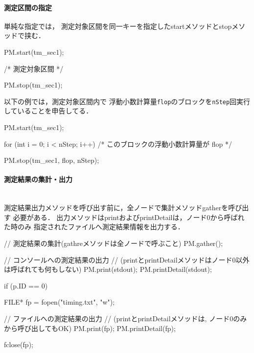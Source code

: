 \paragraph{測定区間の指定}\mbox{}
単純な指定では，
測定対象区間を同一キーを指定したstartメソッドとstopメソッドで挟む．
{\small
\begin{program}
  PM.start(tm_sec1);

  /* 測定対象区間 */

  PM.stop(tm_sec1);
\end{program}
}

以下の例では，測定対象区間内で
浮動小数計算量{\tt flop}のブロックを{\tt nStep}回実行していることを申告してる．
{\small
\begin{program}
  PM.start(tm_sec1);

  for (int i = 0; i < nStep; i++) {
    /* このブロックの浮動小数計算量が flop */
  }

  PM.stop(tm_sec1, flop, nStep);
\end{program}
}

\paragraph{測定結果の集計・出力}\mbox{}\\
測定結果出力メソッドを呼び出す前に，全ノードで集計メソッドgatherを呼び出す
必要がある．
出力メソッドはprintおよびprintDetailは，ノード0から呼ばれた時のみ
指定されたファイルへ測定結果情報を出力する．
{\small
\begin{program}
  // 測定結果の集計(gathreメソッドは全ノードで呼ぶこと)
  PM.gather();

  // コンソールへの測定結果の出力
  // (printとprintDetailメソッドはノード0以外は呼ばれても何もしない)
  PM.print(stdout);
  PM.printDetail(stdout);

  if (p.ID == 0) {
    FILE* fp = fopen("timing.txt", "w");

    // ファイルへの測定結果の出力
    // (printとprintDetailメソッドは, ノード0のみから呼び出してもOK)
    PM.print(fp);
    PM.printDetail(fp);

    fclose(fp);
  }
\end{program}
}

